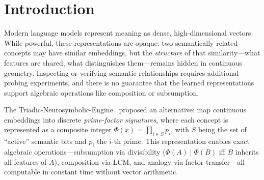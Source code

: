 \documentclass[11pt,a4paper]{article}
\newcommand{\microgpt}{\textsc{TriadicGPT}}
\begin{document}
\begin{abstract}
\microgpt{} achieves 98\% analogy verification (50/51 analogies), 100\% signature uniqueness, and reproducible semantic ordering ($+0.038 \pm 0.005$ gap, $n=3$, 95\% CI positive)---all within a single forward pass. Critically, the triadic head's value lies in \emph{algebraic operations}: 100\% analogy verification, 87.1\% held-out subsumption, and sub-linear compositional chaining, none of which random projections can provide. External evaluation on SimLex-999 reveals that the system does not capture graded semantic similarity (Jaccard $\rho = -0.012$, cosine $\rho = 0.046$; neither significant), motivating the characterization as \emph{algebraic encoding} rather than algebraic semantics. Sparse fine-tuning further reveals a fundamental sparsity--compositionality trade-off: dense codes preserve compositional structure while sparse codes enable subsumption, but no single configuration satisfies both.

\end{abstract}

\section{Introduction}
\label{sec:intro}

Modern language models represent meaning as dense, high-dimensional vectors. While powerful, these representations are opaque: two semantically related concepts may have similar embeddings, but the \emph{structure} of that similarity---what features are shared, what distinguishes them---remains hidden in continuous geometry. Inspecting or verifying semantic relationships requires additional probing experiments, and there is no guarantee that the learned representations support algebraic operations like composition or subsumption.

The Triadic-Neurosymbolic-Engine~\citep{ornelas2026prime} proposed an alternative: map continuous embeddings into discrete \emph{prime-factor signatures}, where each concept is represented as a composite integer $\Phi(x) = \prod_{i \in S} p_i$, with $S$ being the set of ``active'' semantic bits and $p_i$ the $i$-th prime. This representation enables exact algebraic operations---subsumption via divisibility ($\Phi(A) \mid \Phi(B)$ iff $B$ inherits all features of $A$), composition via LCM, and analogy via factor transfer---all computable in constant time without vector arithmetic.
\end{document}
